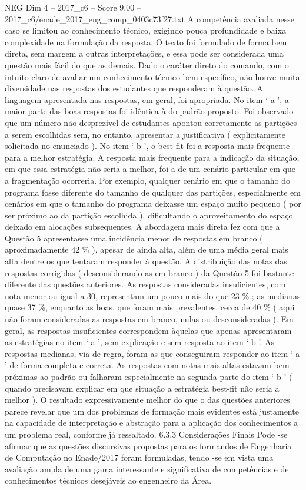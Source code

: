 \begin{textsample}{NEG Dim 4 – 2017\_c6 – Score 9.00 – 2017\_c6/enade\_2017\_eng\_comp\_0403c73f27.txt}
A competência avaliada nesse caso se limitou ao conhecimento técnico, exigindo pouca profundidade e baixa complexidade na formulação da resposta.
O texto foi formulado de forma bem direta, sem margem a outras interpretações, e essa pode ser considerada uma questão mais fácil do que as demais.
Dado o caráter direto do comando, com o intuito claro de avaliar um conhecimento técnico bem específico, não houve muita diversidade nas respostas dos estudantes que responderam à questão.
A linguagem apresentada nas respostas, em geral, foi apropriada.
No item ‘ a ’, a maior parte das boas respostas foi idêntica à do padrão proposto.
Foi observado que um número não desprezível de estudantes apontou corretamente as partições a serem escolhidas sem, no entanto, apresentar a justificativa ( explicitamente solicitada no enunciado ).
No item ‘ b ’, o best-fit foi a resposta mais frequente para a melhor estratégia.
A resposta mais frequente para a indicação da situação, em que essa estratégia não seria a melhor, foi a de um cenário particular em que a fragmentação ocorreria.
Por exemplo, qualquer cenário em que o tamanho do programa fosse diferente do tamanho de qualquer das partições, especialmente em cenários em que o tamanho do programa deixasse um espaço muito pequeno ( por ser próximo ao da partição escolhida ), dificultando o aproveitamento do espaço deixado em alocações subsequentes.
A abordagem mais direta fez com que a Questão 5 apresentasse uma incidência menor de respostas em branco ( aproximadamente 42 \% ), apesar de ainda alta, além de uma média geral mais alta dentre os que tentaram responder à questão.
A distribuição das notas das respostas corrigidas ( desconsiderando as em branco ) da Questão 5 foi bastante diferente das questões anteriores.
As respostas consideradas insuficientes, com nota menor ou igual a 30, representam um pouco mais do que 23 \% ; as medianas quase 37 \%, enquanto as boas, que foram mais prevalentes, cerca de 40 \% ( aqui não foram consideradas as respostas em branco, nulas ou desconsideradas ).
Em geral, as respostas insuficientes correspondem àquelas que apenas apresentaram as estratégias no item ‘ a ’, sem explicação e sem resposta ao item ‘ b ’.
As respostas medianas, via de regra, foram as que conseguiram responder ao item ‘ a ’ de forma completa e correta.
As respostas com notas mais altas estavam bem próximas ao padrão ou falharam especialmente na segunda parte do item ‘ b ’ ( quando precisavam explicar em que situação a estratégia best-fit não seria a melhor ).
O resultado expressivamente melhor do que o das questões anteriores parece revelar que um dos problemas de formação mais evidentes está justamente na capacidade de interpretação e abstração para a aplicação dos conhecimentos a um problema real, conforme já ressaltado. 6.3.3 Considerações Finais Pode -se afirmar que as questões discursivas propostas para os formandos de Engenharia de Computação no Enade/2017 foram formuladas, tendo -se em vista uma avaliação ampla de uma gama interessante e significativa de competências e de conhecimentos técnicos desejáveis ao engenheiro da Área.

\end{textsample}
